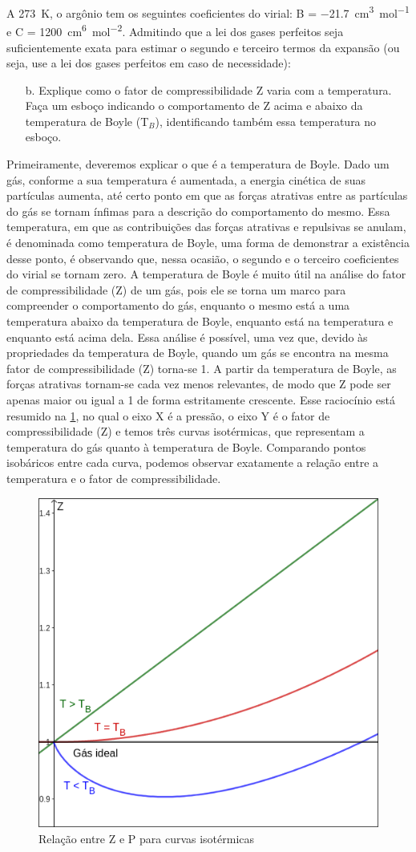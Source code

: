 \begin{xcs}
    A \qty{273}{K}, o argônio tem os seguintes coeficientes do virial: 
    B = \qty{-21,7}{cm^3 mol^{-1}} e C = \qty{1200}{cm^6 mol^{-2}}.
    Admitindo que a lei dos gases perfeitos seja
    suficientemente exata para estimar o segundo e terceiro termos da expansão
    (ou seja, use a lei dos gases perfeitos em caso de necessidade): 
    \begin{enumerate}[label=\alph*.]
        \item[b.] Explique como o fator de compressibilidade Z varia com a
            temperatura. Faça um esboço indicando o comportamento de Z acima e
            abaixo da temperatura de Boyle (T\(_B\)), identificando também essa
            temperatura no esboço. 
    \end{enumerate}
\end{xcs}
\begin{rsl}
    Primeiramente, deveremos explicar o que é a temperatura de Boyle. Dado um gás, conforme a sua temperatura é aumentada, a energia cinética de suas partículas aumenta, até certo ponto em que as forças atrativas entre as partículas do gás se tornam ínfimas para a descrição do comportamento do mesmo. Essa temperatura, em que as contribuições das forças atrativas e repulsivas se anulam, é denominada como temperatura de Boyle, uma forma de demonstrar a existência desse ponto, é observando que, nessa ocasião, o segundo e o terceiro coeficientes do virial se tornam zero.
    A temperatura de Boyle é muito útil na análise do fator de compressibilidade (Z) de um gás, pois ele se torna um marco para compreender o comportamento do gás, enquanto o mesmo está a uma temperatura abaixo da temperatura de Boyle, enquanto está na temperatura e enquanto está acima dela. Essa análise é possível, uma vez que, devido às propriedades da temperatura de Boyle, quando um gás se encontra na mesma fator de compressibilidade (Z) torna-se 1.  A partir da temperatura de Boyle, as forças atrativas tornam-se cada vez menos relevantes, de modo que Z pode ser apenas maior ou igual a 1 de forma estritamente crescente. Esse raciocínio está resumido na \cref{geo3b.png}, no qual o eixo X é a pressão, o eixo Y é o fator de compressibilidade (Z) e temos três curvas isotérmicas, que representam a temperatura do gás quanto à temperatura de Boyle. Comparando pontos isobáricos entre cada curva, podemos observar exatamente a relação entre a temperatura e o fator de compressibilidade.
    \begin{figure}[H]
        \centering
        \includegraphics[width=.4\linewidth]{images/geo3b.png}
        \caption{Relação entre Z e P para curvas isotérmicas}
        \label{geo3b.png}
    \end{figure}
\end{rsl}
